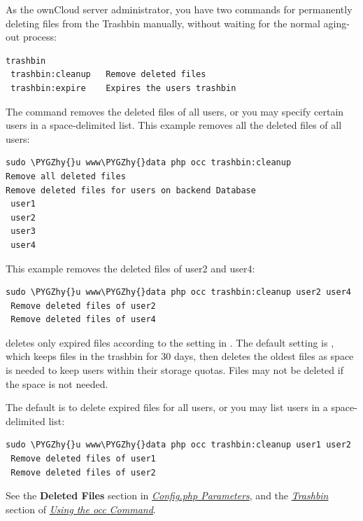 \documentclass[letterpaper,10pt,english]{sphinxmanual}
\def\PYGZhy{\char`\-}
\begin{document}
As the ownCloud server administrator, you have two  commands for permanently deleting files from the Trashbin manually, without waiting for the normal aging-out process:

\begin{Verbatim}[commandchars=\\\{\}]
trashbin
 trashbin:cleanup   Remove deleted files
 trashbin:expire    Expires the users trashbin
\end{Verbatim}

The  command removes the deleted files of all users, or you may specify certain users in a space-delimited list. This example removes all the deleted files of all users:

\begin{Verbatim}[commandchars=\\\{\}]
sudo \PYGZhy{}u www\PYGZhy{}data php occ trashbin:cleanup
Remove all deleted files
Remove deleted files for users on backend Database
 user1
 user2
 user3
 user4
\end{Verbatim}

This example removes the deleted files of user2 and user4:

\begin{Verbatim}[commandchars=\\\{\}]
sudo \PYGZhy{}u www\PYGZhy{}data php occ trashbin:cleanup user2 user4
 Remove deleted files of user2
 Remove deleted files of user4
\end{Verbatim}

 deletes only expired files according to the  setting in . The default setting is , which keeps files in the trashbin for 30 days, then deletes the oldest files as space is needed to keep users within their storage quotas. Files may not be deleted if the space is not needed.

The default is to delete expired files for all users, or you may list users in a space-delimited list:

\begin{Verbatim}[commandchars=\\\{\}]
sudo \PYGZhy{}u www\PYGZhy{}data php occ trashbin:cleanup user1 user2
 Remove deleted files of user1
 Remove deleted files of user2
\end{Verbatim}

See the \textbf{Deleted Files} section in {\hyperref[configuration_server/config_sample_php_parameters::doc]{\emph{\emph{Config.php Parameters}}}}, and the {\hyperref[configuration_server/occ_command:trashbin\string-label]{\emph{Trashbin}}} section of {\hyperref[configuration_server/occ_command::doc]{\emph{\emph{Using the occ Command}}}}.
\end{document}
